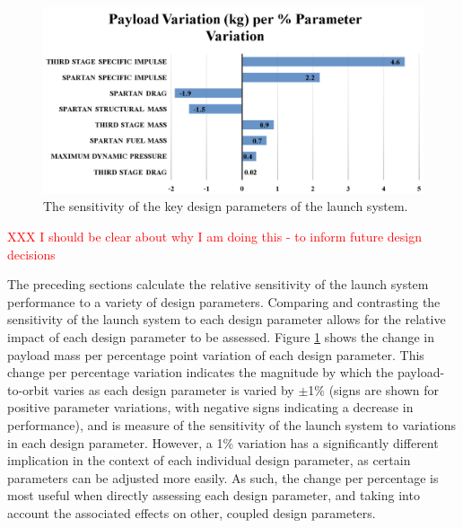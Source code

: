 \begin{figure}[ht!]
	\centering
	\includegraphics[width=0.99\linewidth]{figures/5_Ascent/BarChartRelativePayloadChange}
	\caption{The sensitivity of the key design parameters of the launch system.}
	\label{fig:BarChartRelativePayloadChange}
\end{figure}

\textcolor{red}{XXX I should be clear about why I am doing this - to inform future design decisions}

The preceding sections calculate the relative sensitivity of the launch system performance to a variety of design parameters. 
Comparing and contrasting the sensitivity of the launch system to each design parameter allows for the relative impact of each design parameter to be assessed. 
Figure \ref{fig:BarChartRelativePayloadChange} shows the change in payload mass per percentage point variation of each design parameter. 
This change per percentage variation indicates the magnitude by which the payload-to-orbit varies as each design parameter is varied by $\pm$1\% (signs are shown for positive parameter variations, with negative signs indicating a decrease in performance), and is measure of the sensitivity of the launch system to variations in each design parameter. 
However, a 1\% variation has a significantly different implication in the context of each individual design parameter, as certain parameters can be adjusted more easily. 
As such, the change per percentage is most useful when directly assessing each design parameter, and taking into account the associated effects on other, coupled design parameters. 

